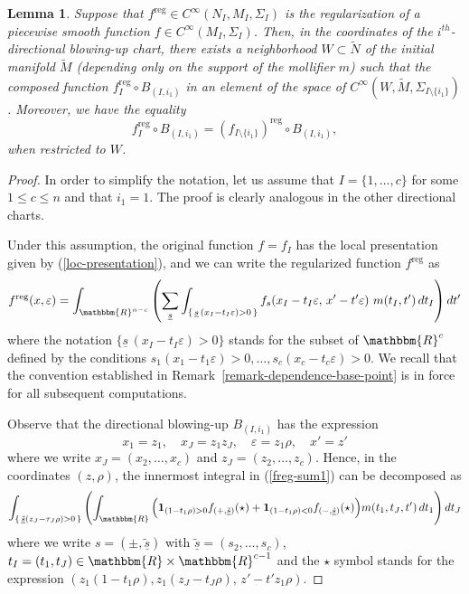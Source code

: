 \documentclass[11pt,psamsfonts]{article}
\newtheorem{Lemma}[Theorem]{Lemma}
\theoremstyle{definition}
\theoremstyle{remark}
\newcommand{\cR}{\ensuremath{\mathbbm{R}}}
\newcommand{\eps}{\varepsilon }
\newcommand{\vf}{f}
\newcommand{\reg}{\mathrm{reg}}
\begin{document}
\begin{Lemma}\label{lemma-+directional}
Suppose that $f^\reg \in C^{\infty}(N_I,M_I,
  \Sigma_I)$ is the regularization of a piecewise smooth function $f\in C^{\infty}(M_I,
  \Sigma_I)$. Then, in the coordinates of the $i^{th}$-directional blowing-up chart, there exists a neighborhood $W \subset \tilde{N}$ of the initial manifold $\tilde M$ (depending only on the support of the mollifier $m$) 
  such that the composed function $f_I^\reg \circ B_{(I, i_1)}$ in an element of the space
  of $C^{\infty} (W, \tilde{M},\Sigma_{I \setminus \{ i_1 \}})$. Moreover, we have the equality
$$
\vf_I^\reg \circ B_{(I,i_1)}= (\vf_{I\setminus\{i_1\}})^\reg \circ B_{(I,i_1)},
$$
when restricted to $W$.
\end{Lemma}
\begin{proof}
In order to simplify the notation, let us assume that $I=\{1,\ldots,c\}$ for some $1 \le c \le n$ and that $i_1 = 1$. The proof is clearly analogous in the other directional charts. 

Under this assumption, the original function $f=f_I$ has the local presentation given by (\ref{loc-presentation}), and we can write the regularized function $f^\reg$ as
\begin{equation}\label{freg-sum1}
f^{\reg}(x,\eps) = 
\int_{\cR^{n-c}} 
  \left( \sum_{\underline{s}}
    \int_{\{\, \underline{s}\, (x_I - t_I\eps ) > 0 \,\}} 
      f_s\!\left(x_I - t_I\eps,\, x'- t'\eps \right)\,
      m(t_I,t') \, d t_I 
  \right) d t' 
\end{equation}
where the notation $\{\underline{s}\, (x_I - t_I \eps)>0\}$ stands for the subset of $\cR^{c}$ defined by the conditions $s_1(x_1 - t_1 \eps)>0,\ldots,s_c(x_c - t_c \eps) > 0$. We recall that the convention established in Remark~\ref{remark-dependence-base-point} is in force for all subsequent computations.

Observe that the directional blowing-up $B_{(I,i_1)}$ has the expression
\begin{equation}\label{x1-directional-blowup}
x_1 = z_1, \quad x_J = z_1 z_J,\quad \eps = z_1 \rho, \quad x' = z'
\end{equation}
where we write ${x}_J = (x_2,\ldots,x_c)$ and ${z}_J = (z_2,\ldots,z_c)$. Hence, in the coordinates $(z,\rho)$, the innermost integral in (\ref{freg-sum1}) can be decomposed as
$$
\int_{\{\, \underline{\tilde s} ({z}_J - \tau_J\rho ) > 0 \,\}}
     \left( \int_{\cR} \Big(
      \mathbf{1}_{(1- t_1 \rho) > 0}f_{(+,\underline{\tilde s})}(\star) + \mathbf{1}_{(1-t_1 \rho) < 0}
      f_{(-,\underline{\tilde s})}(\star) \Big)
      m(t_1,{t}_J,t') \, d t_1 \right) d {t}_J
$$
where we write $s=(\pm,\underline{\tilde s})$ with $\underline{\tilde s} = (s_2,\ldots,s_c)$,  $t_I = (t_1,t_J) \in \cR \times \cR^{c-1}$ and the $\star$ symbol stands for 
the expression $(z_1(1-t_1\rho ),z_1({z}_J-{t}_J\rho),\, z' - t' z_1\rho)$. 


\end{proof}
\end{document}
